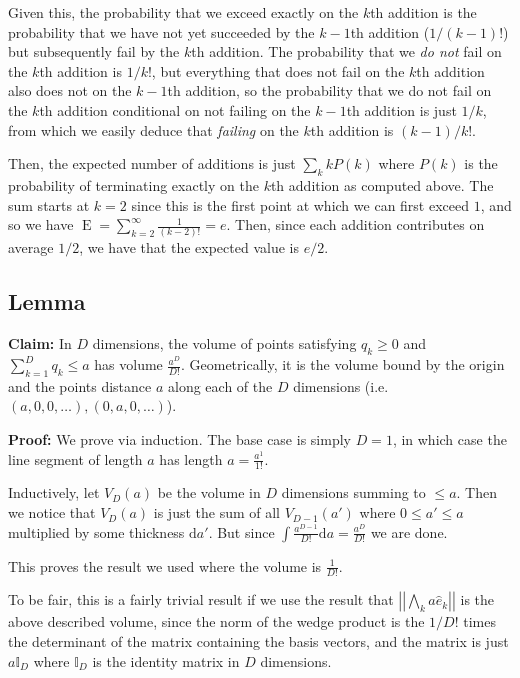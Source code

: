 \documentclass[12pt]{report}
\newcommand{\norm}[1]{\left|\left|#1\right|\right|}
\DeclareMathOperator{\E}{E}
\begin{document}
Given this, the probability that we exceed exactly on the $k$th addition is the
probability that we have not yet succeeded by the $k-1$th addition ($1/(k-1)!$)
but subsequently fail by the $k$th addition. The probability that we \emph{do
not} fail on the $k$th addition is $1/k!$, but everything that does not fail on
the $k$th addition also does not on the $k-1$th addition, so the probability
that we do not fail on the $k$th addition conditional on not failing on the
$k-1$th addition is just $1/k$, from which we easily deduce that \emph{failing}
on the $k$th addition is $(k-1)/k!$.

Then, the expected number of additions is just $\sum\limits_{k}^{} k P(k)$ where
$P(k)$ is the probability of terminating exactly on the $k$th addition as
computed above. The sum starts at $k=2$ since this is the first point at which
we can first exceed $1$, and so we have $\E =
\sum\limits_{k=2}^{\infty}\frac{1}{(k - 2)!} = e$. Then, since each addition
contributes on average $1/2$, we have that the expected value is $e/2$.

\subsection{Lemma}

\textbf{Claim:} In $D$ dimensions, the volume of points satisfying $q_k \geq 0$
and $\sum\limits_{k=1}^{D} q_k \leq a$ has volume $\frac{a^D}{D!}$.
Geometrically, it is the volume bound by the origin and the points distance $a$
along each of the $D$ dimensions (i.e.\ $(a,0,0,\dots), (0,a,0,\dots)$).

\textbf{Proof:} We prove via induction. The base case is simply $D=1$, in which
case the line segment of length $a$ has length $a = \frac{a^1}{1!}$.

Inductively, let $V_D(a)$ be the volume in $D$ dimensions summing to $\leq a$.
Then we notice that $V_D(a)$ is just the sum of all $V_{D - 1}(a')$ where $0
\leq a' \leq a$ multiplied by some thickness $\mathrm{d}a'$. But since $\int
\frac{a^{D - 1}}{D!} \mathrm{d}a = \frac{a^D}{D!}$ we are done.

This proves the result we used where the volume is $\frac{1}{D!}$.

To be fair, this is a fairly trivial result if we use the result that
$\norm{\bigwedge_k a\hat{e}_k}$ is the above described volume, since the norm of
the wedge product is the $1/D!$ times the determinant of the matrix containing
the basis vectors, and the matrix is just $a \mathbb{I}_D$ where $\mathbb{I}_D$
is the identity matrix in $D$ dimensions.
\end{document}
